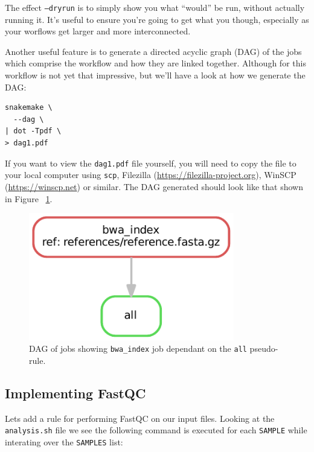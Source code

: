 The effect \texttt{--dryrun} is to simply show you what ``would'' be run, without actually running it.
It's useful to ensure you're going to get what you though, especially as your worflows get larger and more interconnected.

Another useful feature is to generate a directed acyclic graph (DAG) of the jobs which comprise the workflow and how they are linked together.
Although for this workflow is not yet that impressive, but we'll have a look at how we generate the DAG:

\begin{lstlisting}
snakemake \
  --dag \
| dot -Tpdf \
> dag1.pdf
\end{lstlisting}

\begin{warning}

If you want to view the \texttt{dag1.pdf} file yourself, you will need to copy the file to your local computer using \texttt{scp}, Filezilla (\url{https://filezilla-project.org}), WinSCP (\url{https://winscp.net}) or similar.
The DAG generated should look like that shown in Figure ~\ref{fig:dag1}.

\end{warning}

\begin{figure}[H]
\centering
\includegraphics[width=0.8\textwidth]{handout/dag1.pdf}
\caption{DAG of jobs showing \texttt{bwa\_index} job dependant on the \texttt{all} pseudo-rule.}
\label{fig:dag1}
\end{figure}

\newpage
\subsection{Implementing FastQC}

Lets add a rule for performing FastQC on our input files.
Looking at the \texttt{analysis.sh} file we see the following command is executed for each \texttt{SAMPLE} while interating over the \texttt{SAMPLES} list:

